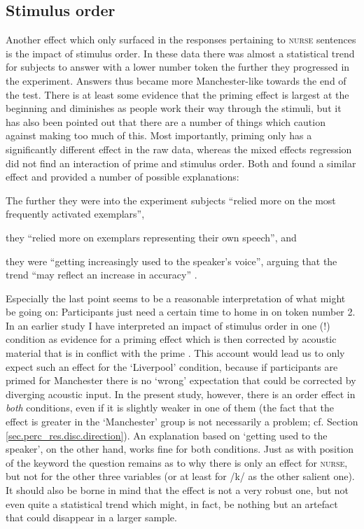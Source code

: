 		\subsection{Stimulus order}

Another effect which only surfaced in the responses pertaining to \textsc{nurse} sentences is the impact of stimulus order.
In these data there was almost a statistical trend for subjects to answer with a lower number token the further they progressed in the experiment.
Answers thus became more Manchester-like towards the end of the test.
There is at least some evidence that the priming effect is largest at the beginning and diminishes as people work their way through the stimuli, but it has also been pointed out that there are a number of things which caution against making too much of this.
Most importantly, priming only has a significantly different effect in the raw data, whereas the mixed effects regression did not find an interaction of prime and stimulus order.
Both \textcite{hayetal2006a} and \textcite{haydrager2010} found a similar effect and provided a number of possible explanations:
	\begin{inparaenum}[(1)]
		\item The further they were into the experiment subjects ``relied more on the most frequently activated exemplars'',
		\item they ``relied more on exemplars representing their own speech'', and
		\item they were ``getting increasingly used to the speaker's voice'', arguing that the trend ``may reflect an increase in accuracy'' \parencite[881--882]{haydrager2010}.
	\end{inparaenum}

Especially the last point seems to be a reasonable interpretation of what might be going on: Participants just need a certain time to home in on token number 2.
In an earlier study I have interpreted an impact of stimulus order in one (!) condition as evidence for a priming effect which is then corrected by acoustic material that is in conflict with the prime \parencite{juskanma}.
This account would lead us to only expect such an effect for the `Liverpool' condition, because if participants are primed for Manchester there is no `wrong' expectation that could be corrected by diverging acoustic input.
In the present study, however, there is an order effect in \emph{both} conditions, even if it is slightly weaker in one of them (the fact that the effect is greater in the `Manchester' group is not necessarily a problem; cf. Section \ref{sec.perc_res.disc.direction}).
An explanation based on `getting used to the speaker', on the other hand, works fine for both conditions.
Just as with position of the keyword the question remains as to why there is only an effect for \textsc{nurse}, but not for the other three variables (or at least for /k/ as the other salient one).
It should also be borne in mind that the effect is not a very robust one, but not even quite a statistical trend which might, in fact, be nothing but an artefact that could disappear in a larger sample.

